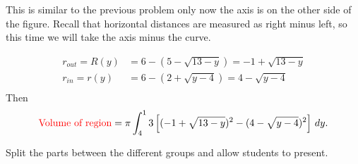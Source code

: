 \documentclass[noinstructornotes]{ximera}
\begin{document}
\begin{problem}
\begin{enumerate}
		\begin{freeResponse}
		This is similar to the previous problem only now the axis is on the other side of the figure.  Recall that horizontal distances are measured as right minus left, so this time we will take the axis minus the curve.

			\begin{align*}
			r_{out} = R(y) &= 6 - (5 - \sqrt{13-y}) = -1 + \sqrt{13-y}  \\
			r_{in} = r(y) &= 6 - (2 + \sqrt{y-4}) =  4 - \sqrt{y-4}  \\
			\end{align*}
		Then
			\[
			\text{{\color{red} Volume of region}} = \pi \int_4^13 \left[ (-1 + \sqrt{13-y})^2 - (4 - \sqrt{y-4})^2 \right] \,d y.
			\]
			

	
		\end{freeResponse}
		
		
		
	\end{enumerate}
		
\end{problem}

\begin{instructorNotes}
Split the parts between the different groups and allow students to present.
\end{instructorNotes}
\end{document}
